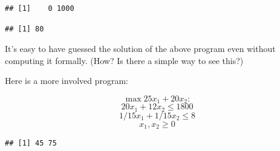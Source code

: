 \documentclass[11pt,]{article}
\newenvironment{Shaded}{\begin{snugshade}}{\end{snugshade}}
\newcommand{\KeywordTok}[1]{\textcolor[rgb]{0.13,0.29,0.53}{\textbf{#1}}}
\newcommand{\DataTypeTok}[1]{\textcolor[rgb]{0.13,0.29,0.53}{#1}}
\newcommand{\DecValTok}[1]{\textcolor[rgb]{0.00,0.00,0.81}{#1}}
\newcommand{\StringTok}[1]{\textcolor[rgb]{0.31,0.60,0.02}{#1}}
\newcommand{\OperatorTok}[1]{\textcolor[rgb]{0.81,0.36,0.00}{\textbf{#1}}}
\newcommand{\NormalTok}[1]{#1}
\begin{document}
\begin{verbatim}
## [1]    0 1000
\end{verbatim}

\begin{Shaded}
\end{Shaded}

\begin{verbatim}
## [1] 80
\end{verbatim}

It's easy to have guessed the solution of the above program even without
computing it formally. (How? Is there a simple way to see this?)

Here is a more involved program:

\[\max{} 25x_1+20x_2: \] \[20x_1+12x_2\leq 1800\]
\[1/15x_1+1/15x_2\leq 8\] \[x_1,x_2\geq 0\]

\begin{Shaded}
\end{Shaded}

\begin{verbatim}
## [1] 45 75
\end{verbatim}
\end{document}
